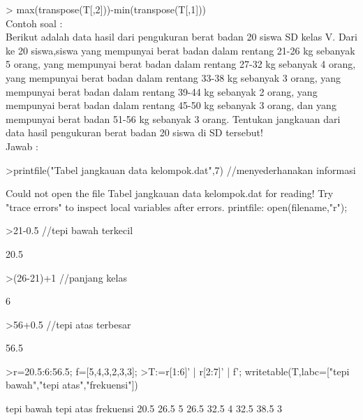 \documentclass[a4paper,10pt]{article}
\begin{document}
\begin{eulernotebook}
\begin{eulercomment}
\begin{eulercomment}
\begin{eulercomment}
\begin{eulercomment}
\begin{eulercomment}
\begin{eulercomment}
\begin{eulercomment}
\begin{eulercomment}
\begin{eulercomment}
\begin{eulercomment}
\begin{eulercomment}
\textgreater{} max(transpose(T[,2]))-min(transpose(T[,1]))\\
Contoh soal :\\
Berikut adalah data hasil dari pengukuran berat badan 20 siswa SD
kelas V. Dari ke 20 siswa,siswa yang mempunyai berat badan dalam
rentang 21-26 kg sebanyak 5 orang, yang mempunyai berat badan dalam
rentang 27-32 kg sebanyak 4 orang, yang mempunyai berat badan dalam
rentang 33-38 kg sebanyak 3 orang, yang mempunyai berat badan dalam
rentang 39-44 kg sebanyak 2 orang, yang mempunyai berat badan dalam
rentang 45-50 kg sebanyak 3 orang, dan yang mempunyai berat badan
51-56 kg sebanyak 3 orang. Tentukan jangkauan dari\\
data hasil pengukuran berat badan 20 siswa di SD tersebut!\\
Jawab :
\end{eulercomment}
\begin{eulerprompt}
>printfile("Tabel jangkauan data kelompok.dat",7) //menyederhanakan informasi
\end{eulerprompt}
\begin{euleroutput}
  Could not open the file
  Tabel jangkauan data kelompok.dat
  for reading!
  Try "trace errors" to inspect local variables after errors.
  printfile:
      open(filename,"r");
\end{euleroutput}
\begin{eulerprompt}
>21-0.5 //tepi bawah terkecil
\end{eulerprompt}
\begin{euleroutput}
  20.5
\end{euleroutput}
\begin{eulerprompt}
>(26-21)+1 //panjang kelas
\end{eulerprompt}
\begin{euleroutput}
  6
\end{euleroutput}
\begin{eulerprompt}
>56+0.5 //tepi atas terbesar
\end{eulerprompt}
\begin{euleroutput}
  56.5
\end{euleroutput}
\begin{eulerprompt}
>r=20.5:6:56.5; f=[5,4,3,2,3,3];
>T:=r[1:6]' | r[2:7]' | f'; writetable(T,labc=["tepi bawah","tepi atas","frekuensi"])
\end{eulerprompt}
\begin{euleroutput}
   tepi bawah tepi atas frekuensi
         20.5      26.5         5
         26.5      32.5         4
         32.5      38.5         3

\end{euleroutput}
\end{eulercomment}
\end{eulercomment}
\end{eulercomment}
\end{eulercomment}
\end{eulercomment}
\end{eulercomment}
\end{eulercomment}
\end{eulercomment}
\end{eulercomment}
\end{eulercomment}
\end{eulernotebook}
\end{document}
